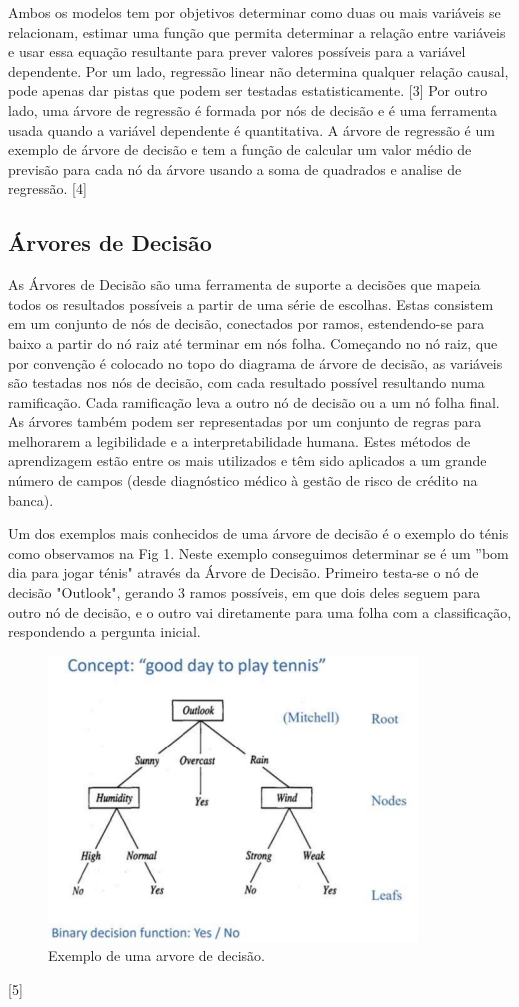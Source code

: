 Ambos os modelos tem por objetivos determinar como duas ou mais variáveis se relacionam, estimar uma função que permita determinar a relação entre variáveis e usar essa equação resultante para prever valores possíveis para a variável dependente. Por um lado, regressão linear não determina qualquer relação causal, pode apenas dar pistas que podem ser testadas estatisticamente. [3]
Por outro lado, uma árvore de regressão é formada por nós de decisão e é uma ferramenta usada quando a variável dependente é quantitativa. A árvore de regressão é um exemplo de árvore de decisão e tem a função de calcular um valor médio de previsão para cada nó da árvore usando a soma de quadrados e analise de regressão. [4]

\subsection{Árvores de Decisão}

As Árvores de Decisão são uma ferramenta de suporte a decisões que mapeia todos os resultados possíveis a partir de uma série de escolhas. Estas consistem em um conjunto de nós de decisão, conectados por ramos, estendendo-se para baixo a partir do nó raiz até terminar em nós folha. Começando no nó raiz, que por convenção é colocado no topo do diagrama de árvore de decisão, as variáveis são testadas nos nós de decisão, com cada resultado possível resultando numa ramificação. Cada ramificação leva a outro nó de decisão ou a um nó folha final. As árvores também podem ser representadas por um conjunto de regras para melhorarem a legibilidade e a interpretabilidade humana. Estes métodos de aprendizagem estão entre os mais utilizados e têm sido aplicados a um grande número de campos (desde diagnóstico médico à gestão de risco de crédito na banca). 

Um dos exemplos mais conhecidos de uma árvore de decisão é o exemplo do ténis como observamos na Fig 1. Neste exemplo conseguimos determinar se é um ”bom dia para jogar ténis" através da Árvore de Decisão. Primeiro testa-se o nó de decisão "Outlook", gerando 3 ramos
possíveis, em que dois deles seguem para outro nó de decisão, e o outro vai diretamente para uma folha com a classificação, respondendo a pergunta inicial.
\begin{figure}[htbp]
\centerline{\includegraphics{images/tenis.png}}
\caption{Exemplo de uma arvore de decisão.}
\label{fig}
\end{figure}
[5]

